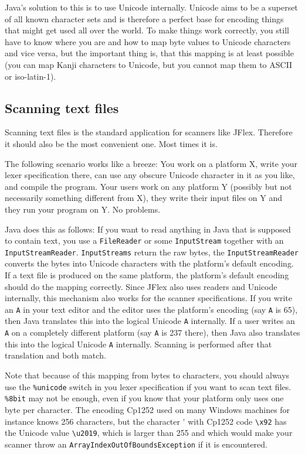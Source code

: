 \documentclass[11pt]{scrartcl}
\begin{document}
Java's solution to this is to use Unicode internally.  Unicode aims to
be a superset of all known character sets and is therefore a perfect base
for encoding things that might get used all over the world. To make
things work correctly, you still have to know where you are and how to
map byte values to Unicode characters and vice versa, but the
important thing is, that this mapping is at least possible (you can
map Kanji characters to Unicode, but you cannot map them to ASCII or
iso-latin-1).

\subsection{Scanning text files\label{sec:howtotext}}

Scanning text files is the standard application for scanners like
JFlex. Therefore it should also be the most convenient one. Most times 
it is.

The following scenario works like a breeze:
You work on a platform X, write your lexer specification there, can
use any obscure Unicode character in it as you like, and compile the
program. Your users work on any platform Y (possibly but not 
necessarily something different from X), they write their input files
on Y and they run your program on Y. No problems.

Java does this as follows:
If you want to read anything in Java that is supposed to contain text, 
you use a \texttt{FileReader} or some \texttt{InputStream} together with
an \texttt{InputStreamReader}. \texttt{InputStreams} return the raw bytes, the 
\texttt{InputStreamReader} converts the bytes into Unicode characters with
the platform's default encoding. If a text file is produced on the
same platform, the platform's default encoding should do the mapping
correctly. Since JFlex also uses readers and Unicode internally, this
mechanism also works for the scanner specifications. If you write an
\texttt{A} in your text editor and the editor uses the platform's encoding (say \texttt{A} is 65), 
then Java translates this into the logical Unicode \texttt{A} internally. 
If a user writes an \texttt{A} on a completely different platform (say \texttt{A} is 237 there),
then Java also translates this into the logical Unicode \texttt{A} internally. Scanning
is performed after that translation and both match.

Note that because of this mapping from bytes to characters, you should always 
use the \texttt{\%unicode} switch in you lexer specification if you want to scan
text files. \texttt{\%8bit} may not be enough, even if
you know that your platform only uses one byte per character. The encoding
Cp1252 used on many Windows machines for instance knows 256 characters, but
the character {\'{}} with Cp1252 code \verb+\x92+ has the Unicode value \verb+\u2019+, which
is larger than 255 and which would make your scanner throw an 
\texttt{ArrayIndexOutOfBoundsException} if it is encountered.
\end{document}
